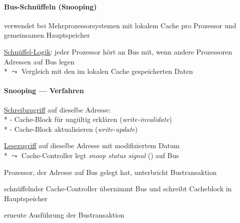 \paragraph{Bus-Schnüffeln (Snooping)}
\begin{items}
	\item verwendet bei Mehrprozessorsystemen mit lokalem Cache pro Prozessor und gemeinsamen Hauptspeicher
	\item \underline{Schnüffel-Logik}: jeder Prozessor hört an Bus mit, wenn andere Prozessoren Adressen auf Bus legen \\* \( \leadsto \) Vergleich mit den im lokalen Cache gespeicherten Daten
\end{items}

\paragraph{Snooping --- Verfahren}
\begin{items}
	\item \underline{Schreibzugriff} auf dieselbe Adresse: \\*
		- Cache-Block für ungültig erklären (\emph{write-invalidate}) \\*
		- Cache-Block aktualisieren (\emph{write-update})
	\item \underline{Lesezugriff} auf dieselbe Adresse mit modifiziertem Datum \\*
		\( \leadsto \) Cache-Controller legt \emph{snoop status signal} () auf Bus
	\begin{enumeration}
		\item Prozessor, der Adresse auf Bus gelegt hat, unterbricht Bustransaktion
		\item schnüffelnder Cache-Controller übernimmt Bus und schreibt Cacheblock in Hauptspeicher
		\item erneute Ausführung der Bustransaktion
	\end{enumeration}
\end{items}